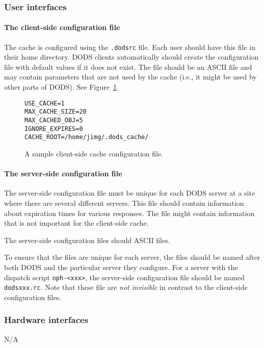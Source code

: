 \documentclass{article}
\begin{document}
\subsubsection{User interfaces}
\label{sec:ui}
\paragraph{The client-side configuration file}
The cache is configured using the \texttt{.dodsrc} file. Each user should
have this file in their home directory. DODS clients automatically should
create the configuration file with default values if it does not exist. The
file should be an ASCII file and may contain parameters that are not used by
the cache (i.e., it might be used by other parts of DODS). See
Figure~\ref{fig:config-file}.

\begin{figure}
\begin{center}
\begin{verbatim}
USE_CACHE=1
MAX_CACHE_SIZE=20
MAX_CACHED_OBJ=5
IGNORE_EXPIRES=0
CACHE_ROOT=/home/jimg/.dods_cache/
\end{verbatim}
\end{center}
\caption{A sample client-side cache configuration file.}
\label{fig:config-file}
\end{figure}

\paragraph{The server-side configuration file}
\label{sec:server-config}
The server-side configuration file must be unique for each DODS server at a
site where there are several different servers. This file should contain
information about expiration times for various responses. The file might
contain information that is not important for the client-side cache.

The server-side configuration files should ASCII files.

To ensure that the files are unique for each server, the files should be
named after both DODS and the particular server they configure. For a server
with the dispatch script \texttt{nph-<xxx>}, the server-side configuration
file should be named \texttt{dodsxxx.rc}. Note that these file are \emph{not
  invisible} in contrast to the client-side configuration files.

\subsubsection{Hardware interfaces}
N/A
\end{document}
